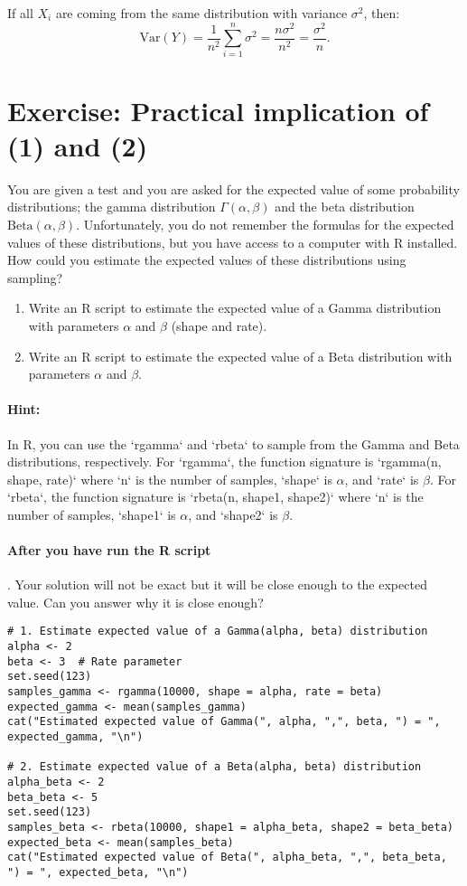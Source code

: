 \documentclass[11pt]{article}
\newif\ifshowanswers
\begin{document}
If all \(X_i\) are coming from the same distribution with variance \(\sigma^2\), then:
\[
  \text{Var}(Y) = \frac{1}{n^2} \sum_{i=1}^n \sigma^2 = \frac{n \sigma^2}{n^2} = \frac{\sigma^2}{n}.
\]
\section{Exercise: Practical implication of (1) and (2)}

You are given a test and you are asked for the expected value of some probability distributions;
the gamma distribution $\Gamma(\alpha, \beta)$ and the beta distribution $\text{Beta}(\alpha, \beta)$.
Unfortunately, you do not remember the formulas for the expected values of these distributions, but you have access to a computer with R installed.
How could you estimate the expected values of these distributions using sampling?


\begin{enumerate}
  \item Write an R script to estimate the expected value of a Gamma distribution with parameters \(\alpha\) and \(\beta\) (shape and rate).
  \item Write an R script to estimate the expected value of a Beta distribution with parameters \(\alpha\) and \(\beta\).
  \end{enumerate}


  \paragraph{Hint:} In R, you can use the `rgamma` and `rbeta` to sample from the Gamma and Beta distributions, respectively.
  For `rgamma`, the function signature is `rgamma(n, shape, rate)` where `n` is the number of samples, `shape` is \(\alpha\), and `rate` is \(\beta\).
  For `rbeta`, the function signature is `rbeta(n, shape1, shape2)` where `n` is the number of samples, `shape1` is \(\alpha\), and `shape2` is \(\beta\).

\paragraph{After you have run the R script}.
Your solution will not be exact but it will be close enough to the expected value.
Can you answer why it is close enough?

  \ifshowanswers
  \begin{verbatim}
# 1. Estimate expected value of a Gamma(alpha, beta) distribution
alpha <- 2
beta <- 3  # Rate parameter
set.seed(123)
samples_gamma <- rgamma(10000, shape = alpha, rate = beta)
expected_gamma <- mean(samples_gamma)
cat("Estimated expected value of Gamma(", alpha, ",", beta, ") = ", expected_gamma, "\n")

# 2. Estimate expected value of a Beta(alpha, beta) distribution
alpha_beta <- 2
beta_beta <- 5
set.seed(123)
samples_beta <- rbeta(10000, shape1 = alpha_beta, shape2 = beta_beta)
expected_beta <- mean(samples_beta)
cat("Estimated expected value of Beta(", alpha_beta, ",", beta_beta, ") = ", expected_beta, "\n")
\end{verbatim}
\end{document}

